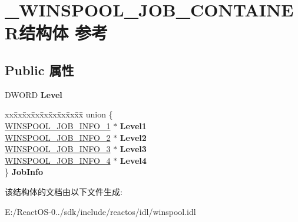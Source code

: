 \hypertarget{struct___w_i_n_s_p_o_o_l___j_o_b___c_o_n_t_a_i_n_e_r}{}\section{\+\_\+\+W\+I\+N\+S\+P\+O\+O\+L\+\_\+\+J\+O\+B\+\_\+\+C\+O\+N\+T\+A\+I\+N\+E\+R结构体 参考}
\label{struct___w_i_n_s_p_o_o_l___j_o_b___c_o_n_t_a_i_n_e_r}
\subsection*{Public 属性}
\begin{DoxyCompactItemize}
\item 
\mbox{\label{struct___w_i_n_s_p_o_o_l___j_o_b___c_o_n_t_a_i_n_e_r_ace59ea17c41b2534101d4c2a3ff8543c}} 
D\+W\+O\+RD {\bfseries Level}
\item 
\mbox{\label{struct___w_i_n_s_p_o_o_l___j_o_b___c_o_n_t_a_i_n_e_r_a566200b494365a90a996dff2294812ba}} 
\begin{tabbing}
xx\=xx\=xx\=xx\=xx\=xx\=xx\=xx\=xx\=\kill
union \{\\
\>\hyperlink{struct___w_i_n_s_p_o_o_l___j_o_b___i_n_f_o__1}{WINSPOOL\_JOB\_INFO\_1} $\ast$ {\bfseries Level1}\\
\>\hyperlink{struct___w_i_n_s_p_o_o_l___j_o_b___i_n_f_o__2}{WINSPOOL\_JOB\_INFO\_2} $\ast$ {\bfseries Level2}\\
\>\hyperlink{struct___w_i_n_s_p_o_o_l___j_o_b___i_n_f_o__3}{WINSPOOL\_JOB\_INFO\_3} $\ast$ {\bfseries Level3}\\
\>\hyperlink{struct___w_i_n_s_p_o_o_l___j_o_b___i_n_f_o__4}{WINSPOOL\_JOB\_INFO\_4} $\ast$ {\bfseries Level4}\\
\} {\bfseries JobInfo}\\

\end{tabbing}\end{DoxyCompactItemize}


该结构体的文档由以下文件生成\+:\begin{DoxyCompactItemize}
\item 
E\+:/\+React\+O\+S-\/0../sdk/include/reactos/idl/winspool.\+idl\end{DoxyCompactItemize}
